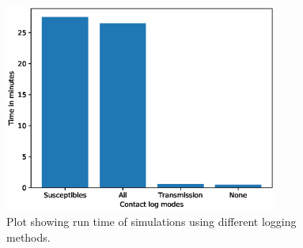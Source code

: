 \documentclass[runningheads]{llncs}
\begin{document}
\begin{figure}[h!]
\centering
	\includegraphics[width=0.8\textwidth]{3_GProf_contactlogmode.eps}
	\caption{Plot showing run time of simulations using different logging methods.} 
	\label{Gprof_contactlogmode}
\end{figure}
\end{document}
